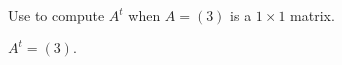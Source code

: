 \documentclass{ximera}
\begin{document}
\begin{exercise} \label{c1.3.5b}
Use \Matlab to compute $A^t$ when $A=(3)$ is a $1\times 1$ matrix.

\begin{solution}
\ans $A^t = (3).$




\end{solution}
\end{exercise}
\end{document}

